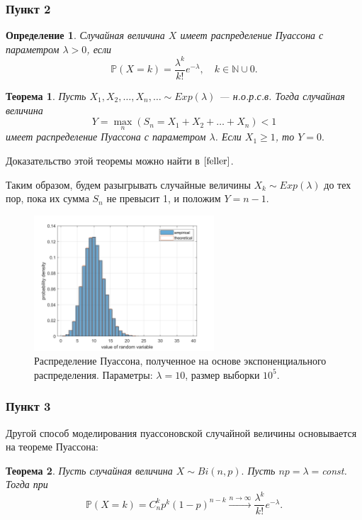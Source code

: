\documentclass[oneside, final, 12pt]{article}
\def\P{{\mathbb{P} }}
\newtheorem{theorem}{Теорема}
\newtheorem{definition}{Определение}
\begin{document}
\subsubsection{Пункт 2}
	\begin{definition}
		Случайная величина $X$ имеет распределение Пуассона с параметром $\lambda > 0$, если
		$$
			\P(X=k) = \frac{\lambda^k}{k!}e^{-\lambda}, \quad k \in \mathbb{N} \cup {0}.
		$$
	\end{definition}
	\begin{theorem}
		Пусть $X_1, X_2, \ldots, X_n, \ldots \sim Exp(\lambda)$ --- н.о.р.с.в. Тогда случайная величина 
		$$
			Y=\max\limits_n(S_n = X_1+X_2+\ldots+X_n)<1
		$$
		имеет распределение Пуассона с параметром $\lambda$. Если $X_1 \geqslant 1$, то $Y = 0.$
	\end{theorem}
	Доказательство этой теоремы можно найти в $\cite{feller}$.

	Таким образом, будем разыгрывать случайные величины $X_k\sim Exp(\lambda)$ до тех пор, пока их 
	сумма $S_n$ не превысит 1, и положим  $Y = n-1$.
	\begin{figure}[h!]
		\centering
		\includegraphics[width=0.6\textwidth]{../code/Task_3/pict/pois_exp_vis_ex.png}
		\caption{Распределение Пуассона, полученное на основе экспоненциального распределения. 
		\newline \centering Параметры: $\lambda = 10$, размер выборки $10^5$.}
    \end{figure}

\newpage
\subsubsection{Пункт 3}
	Другой способ моделирования пуассоновской случайной величины основывается на теореме Пуассона:
	\begin{theorem}
		Пусть случайная величина $X\sim Bi(n,p).$ Пусть $np=\lambda=$const.
		\newline Тогда при 
		$$
			\P (X=k) = C_n^kp^k(1-p)^{n-k} \xrightarrow{n \rightarrow \infty}
						 \dfrac{\lambda^k}{k!} e^{-\lambda}.
		$$
	\end{theorem}
	
\end{document}
